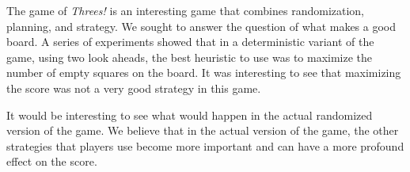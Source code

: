 \documentclass[11pt]{article}
\begin{document}
The game of \emph{Threes!} is an interesting game that combines randomization, planning, and strategy. We sought to answer the question of what makes a good board. A series of experiments showed that in a deterministic variant of the game, using two look aheads, the best heuristic to use was to maximize the number of empty squares on the board. It was interesting to see that maximizing the score was not a very good strategy in this game.

It would be interesting to see what would happen in the actual randomized version of the game. We believe that in the actual version of the game, the other strategies that players use become more important and can have a more profound effect on the score.
\end{document}
